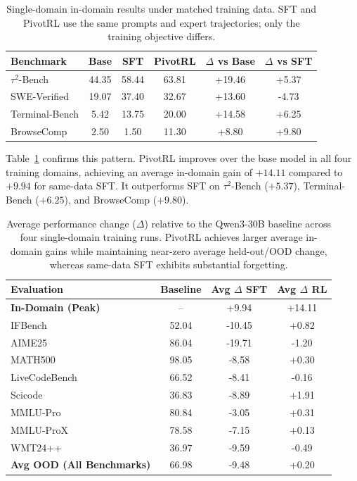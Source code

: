 \begin{table}[t]
\centering
\small
\begin{tabular}{lccccc}
\toprule
\textbf{Benchmark} & \textbf{Base} & \textbf{SFT} & \textbf{PivotRL} & \textbf{$\Delta$ vs Base} & \textbf{$\Delta$ vs SFT} \\
\midrule
$\tau^2$-Bench   & 44.35 & 58.44 & 63.81 & +19.46 & +5.37 \\
SWE-Verified     & 19.07 & 37.40 & 32.67 & +13.60 & -4.73 \\
Terminal-Bench   & 5.42  & 13.75 & 20.00 & +14.58 & +6.25 \\
BrowseComp       & 2.50  & 1.50  & 11.30 & +8.80  & +9.80 \\
\bottomrule
\end{tabular}
\caption{
Single-domain in-domain results under matched training data.
SFT and PivotRL use the same prompts and expert trajectories; only the training objective differs.
}
\label{tab:single_domain_main_results}
\end{table}
 
Table~\ref{tab:single_domain_main_results} confirms this pattern. PivotRL improves over the base model in all four training domains, achieving an average in-domain gain of $+14.11$ compared to $+9.94$ for same-data SFT. It outperforms SFT on $\tau^2$-Bench ($+5.37$), Terminal-Bench ($+6.25$), and BrowseComp ($+9.80$).
 
\begin{table}[t]
\centering
\small
\begin{tabular}{l c cc}
\toprule
\textbf{Evaluation} & \textbf{Baseline} & \textbf{Avg $\Delta$ SFT} & \textbf{Avg $\Delta$ RL} \\
\midrule
\textbf{In-Domain (Peak)} & -- & +9.94 & +14.11 \\
\midrule
IFBench        & 52.04 & -10.45 & +0.82 \\
AIME25         & 86.04 & -19.71 & -1.20 \\
MATH500        & 98.05 & -8.58  & +0.30 \\
LiveCodeBench  & 66.52 & -8.41  & -0.16 \\
Scicode        & 36.83 & -8.89  & +1.91 \\
MMLU-Pro       & 80.84 & -3.05  & +0.31 \\
MMLU-ProX      & 78.58 & -7.15  & +0.13 \\
WMT24++        & 36.97 & -9.59  & -0.49 \\
\midrule
\textbf{Avg OOD (All Benchmarks)} & 66.98 & -9.48 & +0.20 \\
\bottomrule
\end{tabular}
\caption{
Average performance change ($\Delta$) relative to the Qwen3-30B baseline across four single-domain training runs.
PivotRL achieves larger average in-domain gains while maintaining near-zero average held-out/OOD change, whereas same-data SFT exhibits substantial forgetting.
}
\label{tab:single_domain_ood_avg}
\end{table}
 
